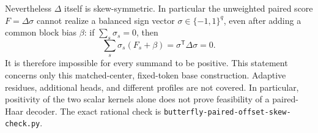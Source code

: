\documentclass{article}
\begin{document}
Nevertheless $\Delta$ itself is skew-symmetric. In particular the
unweighted paired score $F=\Delta\sigma$ cannot realize a balanced
sign vector $\sigma\in\{-1,1\}^q$, even after adding a common block
bias $\beta$: if $\sum_s\sigma_s=0$, then
\[
 \sum_s\sigma_s(F_s+\beta)=\sigma^{\mathsf T}\Delta\sigma=0.
\]
It is therefore impossible for every summand to be positive.
This statement concerns only this matched-center, fixed-token base
construction. Adaptive residues, additional heads, and different
profiles are not covered. In particular, positivity of the two scalar
kernels alone does not prove feasibility of a paired-Haar decoder.
The exact rational check is
\texttt{butterfly-paired-offset-skew-check.py}.
\end{document}
